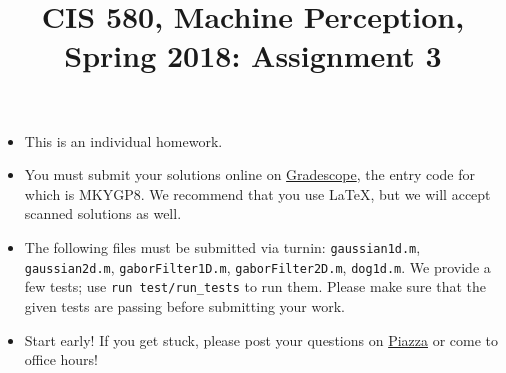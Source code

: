 \documentclass[english]{article}
\title{CIS 580, Machine Perception, Spring 2018: Assignment 3
\ifthenelse{\boolean{ShowSolutions}}{ \\ \bf Solutions }{} }
\date{}
\begin{document}
\maketitle

\begin{itemize}
\item This is an individual homework.%
\item You must submit your solutions online on \href{https://gradescope.com/courses/14413}{Gradescope}, the entry code for which is MKYGP8. We recommend that you use \LaTeX, but we will accept scanned solutions as well.
\item The following files must be submitted via turnin: \verb|gaussian1d.m|, \verb|gaussian2d.m|, \verb|gaborFilter1D.m|,  \verb|gaborFilter2D.m|, \verb|dog1d.m|.
  We provide a few tests; use \verb|run test/run_tests| to run them.
  Please make sure that the given tests are passing before submitting your work.
\item Start early! If you get stuck, please post your questions on \href{https://piazza.com/class/jcamop0erj15o0}{Piazza} or come to office hours!
\end{itemize}

\vspace{1cm}

\end{document}
